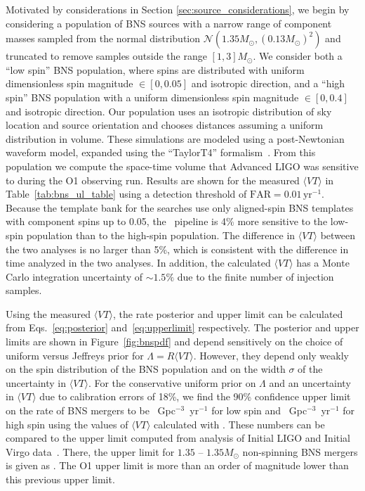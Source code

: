 Motivated by considerations in Section \ref{sec:source_considerations}, we begin by
considering a population of \ac{BNS} sources with a narrow range of component
masses sampled from the normal distribution $\mathcal{N}(1.35M_\odot, (0.13M_\odot)^2)$
and truncated to remove samples outside the range $[1,3] M_{\odot}$. We consider
both a ``low spin'' \ac{BNS} population, where spins are distributed with uniform dimensionless
spin magnitude $\in [0, 0.05]$ and isotropic direction, and a ``high spin'' \ac{BNS}
population with a uniform dimensionless spin magnitude $\in [0, 0.4]$ and isotropic direction.
Our population uses an isotropic distribution of sky location and source orientation and chooses
distances assuming a uniform distribution in volume.
These simulations are modeled using a post-Newtonian waveform model, expanded using the
``TaylorT4'' formalism~\citep{Buonanno:2009zt}.
From this population we compute the space-time volume that Advanced \ac{LIGO} was
sensitive to during the O1 observing run. Results are shown for the measured $\langle VT\rangle$
in Table~\ref{tab:bns_ul_table} using a detection threshold of $\mathrm{FAR} = 0.01\, \mathrm{yr}^{-1}$.
Because the template bank for the searches use only aligned-spin \ac{BNS} templates with 
component spins up to 0.05, the \pycbc\ pipeline is 4\% more sensitive 
to the low-spin population than to the high-spin population.
The difference in $\langle VT\rangle$ between the two analyses is no larger than 5\%, which
is consistent with the difference in time analyzed in the two analyses. 
In addition, the calculated $\langle VT \rangle$
has a Monte Carlo integration uncertainty of $\sim1.5\%$ due to the finite number of injection
samples.

Using the measured $\langle VT \rangle$, the rate posterior and upper limit can be
calculated from Eqs.~\ref{eq:posterior} and~\ref{eq:upperlimit} respectively.
The posterior and upper limits are shown in Figure~\ref{fig:bnspdf} and depend
sensitively on the choice of uniform versus Jeffreys prior
for $\Lambda=R\langle VT \rangle$. However, they depend only weakly on the spin
distribution of the \ac{BNS} population and on the width $\sigma$ of the uncertainty
in $\langle VT \rangle$. For the conservative uniform prior on $\Lambda$ and an
uncertainty in $\langle VT \rangle$ due to calibration errors of 18\%, we find the
90\% confidence upper limit on the rate of \ac{BNS} mergers to be \MainBNSULLowSpin~Gpc$^{-3}$~yr$^{-1}$
for low spin and \MainBNSULHighSpin~Gpc$^{-3}$~yr$^{-1}$ for high spin using the values of $\langle VT \rangle$
calculated with \pycbc. These numbers can be compared to the upper limit 
computed from analysis of Initial \ac{LIGO} and Initial Virgo data~\citep{Colaboration:2011np}. 
There, the upper limit for $1.35$ -- $1.35 M_{\odot}$ non-spinning \ac{BNS} mergers is given 
as \SSixULNoSpin. The O1 upper limit is more than an order of magnitude lower than this previous upper limit.

